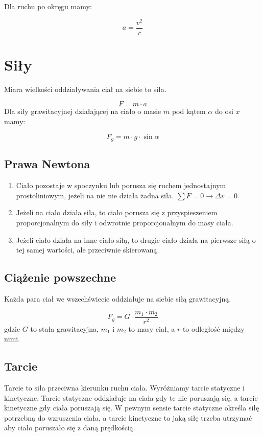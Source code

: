 \documentclass{../notatki}
\begin{document}
Dla ruchu po okręgu mamy:

$$
a = \frac{v^2}{r}
$$

\section{Siły}

Miara wielkości oddziaływania ciał na siebie to siła.

$$
F = m \cdot a
$$
Dla siły grawitacyjnej działającej na ciało o masie $m$ pod kątem
$\alpha$ do osi $x$ mamy:

$$
F_g = m \cdot g \cdot \sin \alpha
$$

\subsection{Prawa Newtona}

\begin{enumerate}
  \item Ciało pozostaje w spoczynku lub porusza się ruchem jednostajnym
    prostoliniowym, jeżeli na nie nie działa żadna siła. $\sum F = 0
    \rightarrow \Delta v = 0$.
  \item Jeżeli na ciało działa siła, to ciało porusza się z przyspieszeniem
    proporcjonalnym do siły i odwrotnie proporcjonalnym do masy ciała.
  \item Jeżeli ciało działa na inne ciało siłą, to drugie ciało działa na
    pierwsze siłą o tej samej wartości, ale przeciwnie skierowaną.
\end{enumerate}

\subsection{Ciążenie powszechne}

Każda para ciał we wszechświecie oddziałuje na siebie siłą grawitacyjną.

$$
F_g = G \cdot \frac{m_1 \cdot m_2}{r^2}
$$
gdzie $G$ to stała grawitacyjna, $m_1$ i $m_2$ to masy ciał, a $r$ to odległość
między nimi.

\subsection{Tarcie}

Tarcie to siła przeciwna kierunku ruchu ciała. Wyróżniamy tarcie statyczne i
kinetyczne. Tarcie statyczne oddziałuje na ciała gdy te nie poruszają się, a
tarcie kinetyczne gdy ciała poruszają się. W pewnym sensie tarcie statyczne
określa siłę potrzebną do wzruszenia ciała, a tarcie kinetyczne to jaką siłę
trzeba utrzymać aby ciało poruszało się z daną prędkością.
\end{document}
